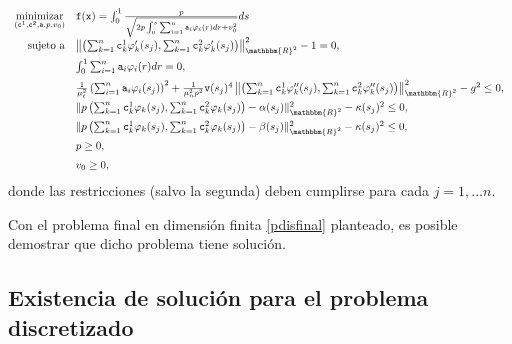 \documentclass[a4paper,10pt]{book}
\newcommand{\R}{\mathbbm{R}}
\begin{document}
\begin{equation}\label{pdisfinal}
\begin{array}{rl}
\displaystyle \mathop{\mathrm{minimizar}}_{(\texttt{c}^1,\texttt{c}^2,\texttt{a},p,v_0)} & \texttt{f}(\texttt{x})=\int_0^1\frac{p}{\sqrt{2p\int_0^s \sum_{i=1}^n\texttt{a}_i\varphi_i(r)dr +v_0^2}}ds\\
 \mathrm{sujeto \ a} & \left\|\left(\sum_{k=1}^n\texttt{c}^1_k\varphi'_k(s_j), \sum_{k=1}^n\texttt{c}^2_k\varphi'_k(s_j)\right)\right\|_{\R^2}^2-1=0,\\[2mm]
                     & \int_{0}^{1} \sum_{i=1}^n\texttt{a}_i\varphi_i(r)dr=0,\\[2mm]
                     & \frac{1}{\mu_t^2} \left(\sum_{i=1}^n\texttt{a}_i\varphi_i(s_j)\right)^2 + \frac{1}{\mu_n^2 p^2}\texttt{v}(s_j)^4\left\| \left(\sum_{k=1}^n\texttt{c}^1_k\varphi_k''(s_j), \sum_{k=1}^n\texttt{c}^2_k\varphi_k''(s_j)\right) \right\|_{\R^2}^2-g^2\leq 0,\,\\[2mm]
                     &  \|p\left(\sum_{k=1}^n\texttt{c}^1_k\varphi_k(s_j), \sum_{k=1}^n\texttt{c}^2_k\varphi_k(s_j)\right)-\alpha(s_j)\|_{\R^2}^2-\kappa(s_j)^2 \leq 0,\, \\[2mm]
                     &  \|p\left(\sum_{k=1}^n\texttt{c}^1_k\varphi_k(s_j), \sum_{k=1}^n\texttt{c}^2_k\varphi_k(s_j)\right)-\beta(s_j)\|_{\R^2}^2-\kappa(s_j)^2 \leq 0, \,\\[2mm]
                     & p\geq 0,\,\\[2mm]
                     & v_0\geq 0,

  \end{array}
\end{equation}
donde las restricciones (salvo la segunda) deben cumplirse para cada $j=1,\ldots n$.

Con el problema final en dimensión finita \eqref{pdisfinal} planteado, es posible demostrar que dicho problema tiene solución.

\subsection{Existencia de solución para el problema discretizado}\label{existsoldiscretizado}
\end{document}

